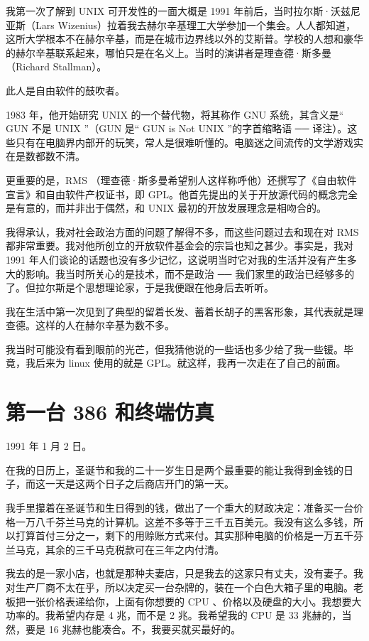 我第一次了解到 UNIX 可开发性的一面大概是 1991 年前后，当时拉尔斯·沃兹尼亚斯（Lars Wizenius）拉着我去赫尔辛基理工大学参加一个集会。人人都知道，这所大学根本不在赫尔辛基，而是在城市边界线以外的艾斯普。学校的人想和豪华的赫尔辛基联系起来，哪怕只是在名义上。当时的演讲者是理查德·斯多曼（Richard Stallman）。

此人是自由软件的鼓吹者。

1983 年，他开始研究 UNIX 的一个替代物，将其称作 GNU 系统，其含义是“ GUN 不是 UNIX ”（GUN 是“ GUN is Not UNIX ”的字首缩略语 ── 译注）。这些只有在电脑界内部开的玩笑，常人是很难听懂的。电脑迷之间流传的文学游戏实在是数都数不清。

更重要的是，RMS （理查德·斯多曼希望别人这样称呼他）还撰写了《自由软件宣言》和自由软件产权证书，即 GPL。他首先提出的关于开放源代码的概念完全是有意的，而并非出于偶然，和 UNIX 最初的开放发展理念是相吻合的。

我得承认，我对社会政治方面的问题了解得不多，而这些问题过去和现在对 RMS 都非常重要。我对他所创立的开放软件基金会的宗旨也知之甚少。事实是，我对 1991 年人们谈论的话题也没有多少记忆，这说明当时它对我的生活并没有产生多大的影响。我当时所关心的是技术，而不是政治 ── 我们家里的政治已经够多的了。但拉尔斯是个思想理论家，于是我便跟在他身后去听听。

我在生活中第一次见到了典型的留着长发、蓄着长胡子的黑客形象，其代表就是理查德。这样的人在赫尔辛基为数不多。

我当时可能没有看到眼前的光芒，但我猜他说的一些话也多少给了我一些锾。毕竟，我后来为 linux 使用的就是 GPL。就这样，我再一次走在了自己的前面。

 
\section{第一台 386 和终端仿真}

1991 年 1 月 2 日。

在我的日历上，圣诞节和我的二十一岁生日是两个最重要的能让我得到金钱的日子，而这一天是这两个日子之后商店开门的第一天。

我手里攥着在圣诞节和生日得到的钱，做出了一个重大的财政决定：准备买一台价格一万八千芬兰马克的计算机。这差不多等于三千五百美元。我没有这么多钱，所以打算首付三分之一，剩下的用赊账方式来付。其实那种电脑的价格是一万五千芬兰马克，其余的三千马克税款可在三年之内付清。

我去的是一家小店，也就是那种夫妻店，只是我去的这家只有丈夫，没有妻子。我对生产厂商不太在乎，所以决定买一台杂牌的，装在一个白色大箱子里的电脑。老板把一张价格表递给你，上面有你想要的 CPU 、价格以及硬盘的大小。我想要大功率的。我希望内存是 4 兆，而不是 2 兆。我希望我的 CPU 是 33 兆赫的，当然，要是 16 兆赫也能凑合。不，我要买就买最好的。

